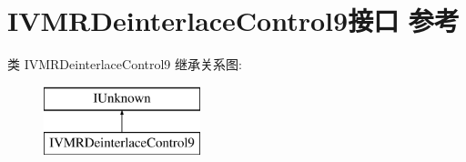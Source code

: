 \hypertarget{interface_i_v_m_r_deinterlace_control9}{}\section{I\+V\+M\+R\+Deinterlace\+Control9接口 参考}
\label{interface_i_v_m_r_deinterlace_control9}
类 I\+V\+M\+R\+Deinterlace\+Control9 继承关系图\+:\begin{figure}[H]
\begin{center}
\leavevmode
\includegraphics[height=2.000000cm]{interface_i_v_m_r_deinterlace_control9}
\end{center}
\end{figure}

